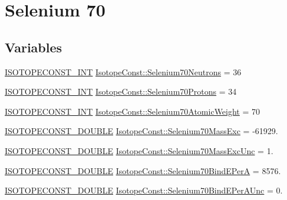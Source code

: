 \hypertarget{group___isotope_const-_selenium-_se70}{}\section{Selenium 70}
\label{group___isotope_const-_selenium-_se70}
\subsection*{Variables}
\begin{DoxyCompactItemize}
\item 
\mbox{\hyperlink{group___isotope_const-_macros_ga5f18360b3e99483a35c32d789e62621c}{I\+S\+O\+T\+O\+P\+E\+C\+O\+N\+S\+T\+\_\+\+I\+NT}} \mbox{\hyperlink{group___isotope_const-_selenium-_se70_ga91a2e994fbc0f65f79502502ca167854}{Isotope\+Const\+::\+Selenium70\+Neutrons}} = 36
\item 
\mbox{\hyperlink{group___isotope_const-_macros_ga5f18360b3e99483a35c32d789e62621c}{I\+S\+O\+T\+O\+P\+E\+C\+O\+N\+S\+T\+\_\+\+I\+NT}} \mbox{\hyperlink{group___isotope_const-_selenium-_se70_ga460bb7495c09188d522c60ce8a02d76c}{Isotope\+Const\+::\+Selenium70\+Protons}} = 34
\item 
\mbox{\hyperlink{group___isotope_const-_macros_ga5f18360b3e99483a35c32d789e62621c}{I\+S\+O\+T\+O\+P\+E\+C\+O\+N\+S\+T\+\_\+\+I\+NT}} \mbox{\hyperlink{group___isotope_const-_selenium-_se70_ga7d5321855cde082ef5ea2696592902a9}{Isotope\+Const\+::\+Selenium70\+Atomic\+Weight}} = 70
\item 
\mbox{\hyperlink{group___isotope_const-_macros_ga8f45a7272ce02c0b4c65c44636ed719a}{I\+S\+O\+T\+O\+P\+E\+C\+O\+N\+S\+T\+\_\+\+D\+O\+U\+B\+LE}} \mbox{\hyperlink{group___isotope_const-_selenium-_se70_gaf2f69a68c18d190ca0ee07954a803006}{Isotope\+Const\+::\+Selenium70\+Mass\+Exc}} = -\/61929.
\item 
\mbox{\hyperlink{group___isotope_const-_macros_ga8f45a7272ce02c0b4c65c44636ed719a}{I\+S\+O\+T\+O\+P\+E\+C\+O\+N\+S\+T\+\_\+\+D\+O\+U\+B\+LE}} \mbox{\hyperlink{group___isotope_const-_selenium-_se70_ga69adbf80d5e97c989be26d535f5dabc3}{Isotope\+Const\+::\+Selenium70\+Mass\+Exc\+Unc}} = 1.
\item 
\mbox{\hyperlink{group___isotope_const-_macros_ga8f45a7272ce02c0b4c65c44636ed719a}{I\+S\+O\+T\+O\+P\+E\+C\+O\+N\+S\+T\+\_\+\+D\+O\+U\+B\+LE}} \mbox{\hyperlink{group___isotope_const-_selenium-_se70_ga290ef0a38d440f1597aa7a22c9eb047c}{Isotope\+Const\+::\+Selenium70\+Bind\+E\+PerA}} = 8576.
\item 
\mbox{\hyperlink{group___isotope_const-_macros_ga8f45a7272ce02c0b4c65c44636ed719a}{I\+S\+O\+T\+O\+P\+E\+C\+O\+N\+S\+T\+\_\+\+D\+O\+U\+B\+LE}} \mbox{\hyperlink{group___isotope_const-_selenium-_se70_gaa7debb5e224e04f6e89aff36549b16fd}{Isotope\+Const\+::\+Selenium70\+Bind\+E\+Per\+A\+Unc}} = 0.

\end{DoxyCompactItemize}
